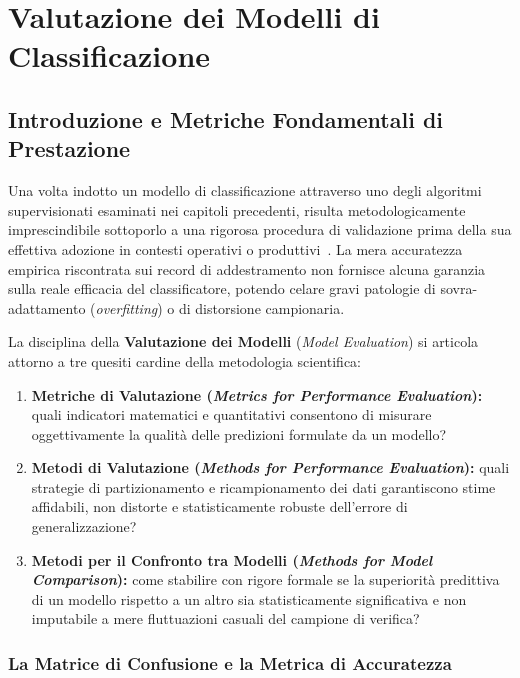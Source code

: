 \chapter{Valutazione dei Modelli di Classificazione}
\label{ch:dm-model-evaluation}

\section{Introduzione e Metriche Fondamentali di Prestazione}
\label{sec:dm-eval-intro-metrics}

Una volta indotto un modello di classificazione attraverso uno degli algoritmi supervisionati esaminati nei capitoli precedenti, risulta metodologicamente imprescindibile sottoporlo a una rigorosa procedura di validazione prima della sua effettiva adozione in contesti operativi o produttivi~\cite{tan2018}. La mera accuratezza empirica riscontrata sui record di addestramento non fornisce alcuna garanzia sulla reale efficacia del classificatore, potendo celare gravi patologie di sovra-adattamento (\textit{overfitting}) o di distorsione campionaria.

La disciplina della \textbf{Valutazione dei Modelli} (\textit{Model Evaluation}) si articola attorno a tre quesiti cardine della metodologia scientifica:
\begin{enumerate}
    \item \textbf{Metriche di Valutazione (\textit{Metrics for Performance Evaluation}):} quali indicatori matematici e quantitativi consentono di misurare oggettivamente la qualità delle predizioni formulate da un modello?
    \item \textbf{Metodi di Valutazione (\textit{Methods for Performance Evaluation}):} quali strategie di partizionamento e ricampionamento dei dati garantiscono stime affidabili, non distorte e statisticamente robuste dell'errore di generalizzazione?
    \item \textbf{Metodi per il Confronto tra Modelli (\textit{Methods for Model Comparison}):} come stabilire con rigore formale se la superiorità predittiva di un modello rispetto a un altro sia statisticamente significativa e non imputabile a mere fluttuazioni casuali del campione di verifica?
\end{enumerate}

\FloatBarrier
\subsection{La Matrice di Confusione e la Metrica di Accuratezza}
\label{subsec:dm-confusion-matrix-accuracy}


